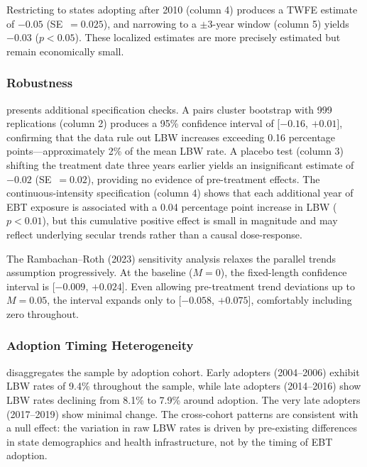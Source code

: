 \documentclass[12pt]{article}
\begin{document}
Restricting to states adopting after 2010 (column 4) produces a TWFE estimate of $-0.05$ (SE~$=0.025$), and narrowing to a $\pm$3-year window (column 5) yields $-0.03$ ($p<0.05$). These localized estimates are more precisely estimated but remain economically small.

\subsubsection*{Robustness}  presents additional specification checks. A pairs cluster bootstrap with 999 replications (column 2) produces a 95\% confidence interval of [$-0.16$, $+0.01$], confirming that the data rule out LBW increases exceeding 0.16 percentage points---approximately 2\% of the mean LBW rate. A placebo test (column 3) shifting the treatment date three years earlier yields an insignificant estimate of $-0.02$ (SE~$=0.02$), providing no evidence of pre-treatment effects. The continuous-intensity specification (column 4) shows that each additional year of EBT exposure is associated with a 0.04 percentage point increase in LBW ($p<0.01$), but this cumulative positive effect is small in magnitude and may reflect underlying secular trends rather than a causal dose-response.

The Rambachan--Roth (2023) sensitivity analysis relaxes the parallel trends assumption progressively. At the baseline ($M=0$), the fixed-length confidence interval is [$-0.009$, $+0.024$]. Even allowing pre-treatment trend deviations up to $M=0.05$, the interval expands only to [$-0.058$, $+0.075$], comfortably including zero throughout.



\subsubsection*{Adoption Timing Heterogeneity}  disaggregates the sample by adoption cohort. Early adopters (2004--2006) exhibit LBW rates of 9.4\% throughout the sample, while late adopters (2014--2016) show LBW rates declining from 8.1\% to 7.9\% around adoption. The very late adopters (2017--2019) show minimal change. The cross-cohort patterns are consistent with a null effect: the variation in raw LBW rates is driven by pre-existing differences in state demographics and health infrastructure, not by the timing of EBT adoption.


\end{document}
